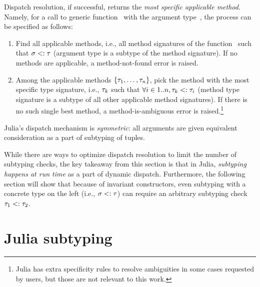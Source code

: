 Dispatch resolution, if successful, returns the \emph{most specific applicable
method}. Namely, for a call to generic function~ with the argument
type~\gty, the process can be specified as follows:
\begin{enumerate}
  \item Find all applicable methods, i.e., all method signatures \ty of the
    function~ such that $\sigma <: \tau$ (argument type is a subtype of the
    method signature).
    If no methods are applicable, a method-not-found error is raised.
  \item Among the applicable methods $\{\tau_1, \ldots, \tau_n\}$,
    pick the method with the most specific type signature,
    i.e., $\tau_k$ such that $\forall i\in1..n, \tau_k <: \tau_i$ 
    (method type signature is a subtype of all other applicable method
    signatures). If there is no such single best method, a method-is-ambiguous
    error is raised.\footnote{Julia has extra specificity rules
    to resolve ambiguities in some cases requested by users,
    but those are not relevant to this work.}
\end{enumerate}
Julia's dispatch mechanism is \emph{symmetric}: all arguments are given
equivalent consideration as a part of subtyping of tuples.

While there are ways to optimize dispatch resolution to limit the number of
subtyping checks, the key takeaway from this section is that
in Julia, \emph{subtyping happens at run time} as a part of dynamic dispatch.
Furthermore, the following section will show that because of invariant
constructors, even subtyping with a concrete type on the left
(i.e., $\sigma <: \tau$) can require an arbitrary subtyping check $\tau_1 <: \tau_2$.

\section{Julia subtyping}\label{sec:2:subtyping}
